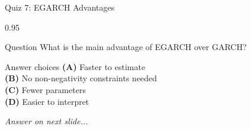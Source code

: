 \documentclass[9pt, aspectratio=169, t]{beamer}
\begin{document}
\begin{frame}{Quiz 7: EGARCH Advantages}
    \begin{cminipage}{0.95\textwidth}
    \begin{alertblock}{Question}
        What is the main advantage of EGARCH over GARCH?
    \end{alertblock}

    \vspace{0.4cm}

    \begin{block}{Answer choices}
        \textcolor{MainBlue}{\textbf{(A)}} Faster to estimate\\[3pt]
        \textcolor{MainBlue}{\textbf{(B)}} No non-negativity constraints needed\\[3pt]
        \textcolor{MainBlue}{\textbf{(C)}} Fewer parameters\\[3pt]
        \textcolor{MainBlue}{\textbf{(D)}} Easier to interpret
    \end{block}

    \vspace{0.5cm}

    \begin{center}
        \textit{Answer on next slide...}
    \end{center}
    \end{cminipage}
\end{frame}
\end{document}
